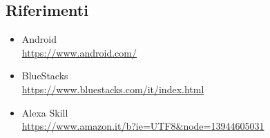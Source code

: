\subsection{Riferimenti}
\label{sec:subsec_riferimenti}
\begin{itemize}
	\item Android\\ \href{https://www.android.com/}{https://www.android.com/}
	\item BlueStacks\\ \href{https://www.bluestacks.com/it/index.html}{https://www.bluestacks.com/it/index.html}
	\item Alexa Skill\\ \href{https://www.amazon.it/b?ie=UTF8\&node=13944605031}{https://www.amazon.it/b?ie=UTF8\&node=13944605031}
\end{itemize}